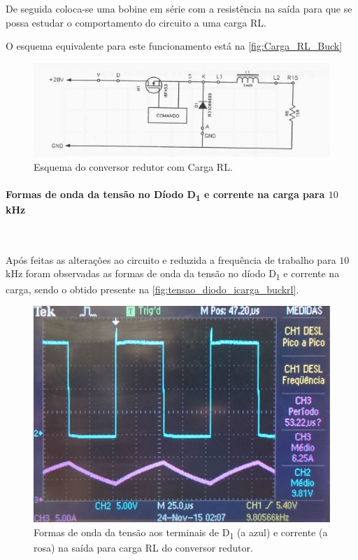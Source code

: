 \documentclass[a4paper,11pt]{article}
\numberwithin{equation}{section}
\begin{document}
De seguida coloca-se uma bobine em série com a resistência na saída para que se possa estudar o comportamento do circuito a uma carga RL.

O esquema equivalente para este funcionamento está na \autoref{fig:Carga_RL_Buck}

\begin{figure}[h]
	\centering
	\includegraphics[keepaspectratio=true, scale=0.8]{teoricas/Carga_RL_Buck}
	\caption{Esquema do conversor redutor com Carga RL.}
	\label{fig:Carga_RL_Buck}
	\vspace{-0.8em}
\end{figure}

\paragraph{Formas de onda da tensão no Díodo D\textsubscript{1} e corrente na carga para $10$ kHz}\mbox{}\

Após feitas as alterações ao circuito e reduzida a frequência de trabalho para $10$ kHz foram observadas as formas de onda da tensão no díodo D\textsubscript{1} e corrente na carga, sendo o obtido presente na \autoref{fig:tensao_diodo_icarga_buckrl}.

\begin{figure}[H]
	\centering
	\includegraphics[keepaspectratio=true, scale=0.13]{img/figs/tensao_diodo_icarga_buckrl}
	\caption{Formas de onda da tensão aos terminais de D\textsubscript{1} (a azul) e corrente (a rosa) na saída para carga RL do conversor redutor.}
	\label{fig:tensao_diodo_icarga_buckrl}
	\vspace{-0.8em}
\end{figure} 
\end{document}
